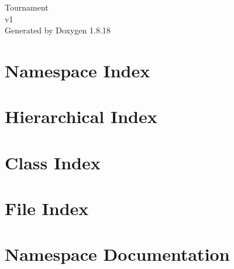 \let\mypdfximage\pdfximage\def\pdfximage{\immediate\mypdfximage}\documentclass[twoside]{book}
\newcommand{\+}{\discretionary{\mbox{\scriptsize$\hookleftarrow$}}{}{}}
\newcommand{\clearemptydoublepage}{%
  \newpage{\pagestyle{empty}\cleardoublepage}%
}
\begin{document}
\hypersetup{pageanchor=false,
             bookmarksnumbered=true,
             pdfencoding=unicode
            }
\begin{titlepage}
\vspace*{7cm}
\begin{center}%
{\Large Tournament \\[1ex]\large v1 }\\
\vspace*{1cm}
{\large Generated by Doxygen 1.8.18}\\
\end{center}
\end{titlepage}
\clearemptydoublepage
{}
\tableofcontents
\clearemptydoublepage
{}
\hypersetup{pageanchor=true}

\chapter{Namespace Index}

\chapter{Hierarchical Index}

\chapter{Class Index}

\chapter{File Index}

\chapter{Namespace Documentation}











\end{document}
